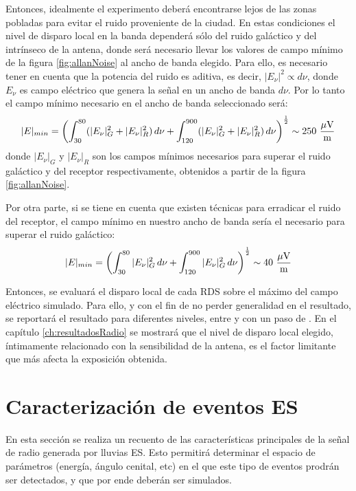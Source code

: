 	Entonces, idealmente el experimento deber\'a encontrarse lejos de las zonas pobladas para evitar el ruido proveniente de la ciudad.
	En estas condiciones el nivel de disparo local en la banda  depender\'a s\'olo del ruido gal\'actico y del intr\'inseco de la antena, donde ser\'a necesario llevar los valores de campo m\'inimo de la figura \ref{fig:allanNoise} al ancho de banda elegido.
	Para ello, es necesario tener en cuenta que la potencia del ruido es aditiva, es decir, $|E_\nu|^2\propto d\nu$, donde $E_\nu$ es campo el\'ectrico que genera la se\~nal en un ancho de banda $d\nu$.
	Por lo tanto el campo m\'inimo necesario en el ancho de banda seleccionado ser\'a:
	\begin{equation}
	|E|_{min}=\left(\int_{30}^{80}(|E_\nu|^2_G+|E_\nu|^2_R)\,d\nu+
	\int_{120}^{900}(|E_\nu|^2_G+|E_\nu|^2_R)\,d\nu
	\right)^\frac{1}{2}
	\sim 250 {\rm\ \dfrac{\mu V}{m}}
	\end{equation}
	donde $|E_\nu|_G$ y $|E_\nu|_R$ son los campos m\'inimos necesarios para superar el ruido gal\'actico y del receptor respectivamente, obtenidos a partir de la figura \ref{fig:allanNoise}.
	
	Por otra parte, si se tiene en cuenta que existen t\'ecnicas para erradicar el ruido del receptor, el campo m\'inimo en nuestro ancho de banda ser\'ia el necesario para superar el ruido gal\'actico:
	\begin{equation}
	|E|_{min}=\left(\int_{30}^{80}|E_\nu|^2_G \,d\nu+
	\int_{120}^{900}|E_\nu|^2_G\, d\nu
	\right)^\frac{1}{2}
	\sim 40 {\rm\ \dfrac{\mu V}{m}}
	\end{equation}
	
	Entonces, se evaluar\'a el disparo local de cada RDS sobre el m\'aximo del campo el\'ectrico simulado.
	Para ello, y con el fin de no perder generalidad en el resultado, se reportar\'a el resultado para diferentes niveles, entre  y  con un paso de .
	En el cap\'itulo \ref{ch:resultadosRadio} se mostrar\'a que el nivel de disparo local elegido, \'intimamente relacionado con la sensibilidad de la antena, es el factor limitante que m\'as afecta la exposici\'on obtenida.
	
	
\section{Caracterizaci\'on de eventos ES}

En esta secci\'on se realiza un recuento de las caracter\'isticas principales de la se\~nal de radio generada por lluvias ES.
Esto permitir\'a determinar el espacio de par\'ametros (energ\'ia, \'angulo cenital, etc) en el que este tipo de eventos prodr\'an ser detectados, y que por ende deber\'an ser simulados.

